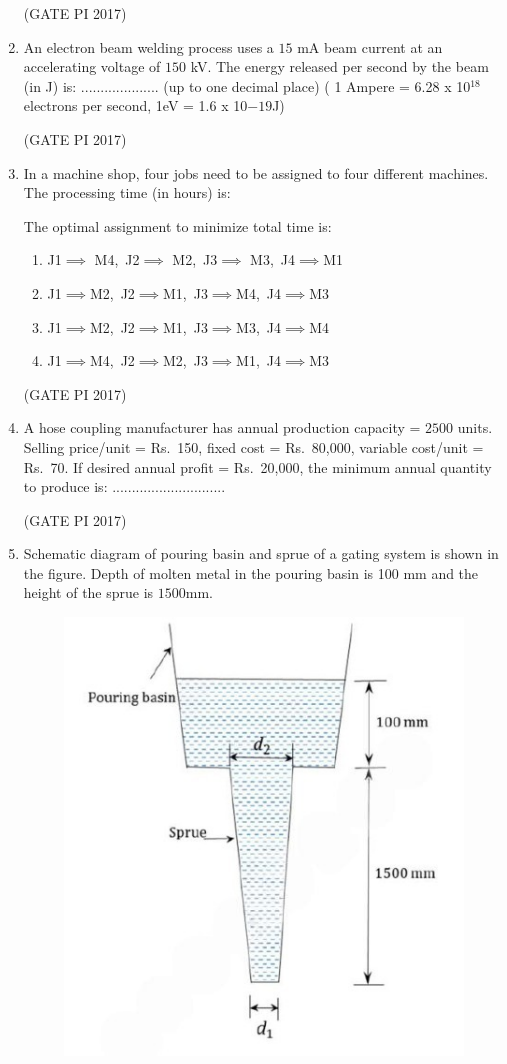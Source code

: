 \documentclass[journal,12pt,onecolumn]{IEEEtran}
\theoremstyle{remark}
\begin{document}
\begin{enumerate}
\hfill (GATE PI 2017)

\item An electron beam welding process uses a $15$ mA beam current at an accelerating voltage of $150$ kV.  
The energy released per second by the beam (in J) is:  
.................... (up to one decimal place) ( 1 Ampere = 6.28 x 10$^{18}$ electrons per second, 1eV = 1.6 x 10$-19$J)  

\hfill (GATE PI 2017)

\item In a machine shop, four jobs need to be assigned to four different machines. The processing time (in hours) is:



The optimal assignment to minimize total time is:
\begin{enumerate}
\item J1$\implies$ M4,\ J2$\implies$ M2,\ J3$\implies$ M3,\ J4$\implies$M1
\item J1$\implies$M2,\ J2$\implies$M1,\ J3$\implies$M4,\ J4$\implies$M3
\item J1$\implies$M2,\ J2$\implies$M1,\ J3$\implies$M3,\ J4$\implies$M4
\item J1$\implies$M4,\ J2$\implies$M2,\ J3$\implies$M1,\ J4$\implies$M3
\end{enumerate}
\hfill (GATE PI 2017)

\item A hose coupling manufacturer has annual production capacity = $2500$ units.  
Selling price/unit = Rs.\ 150, fixed cost = Rs.\ 80{,}000, variable cost/unit = Rs.\ 70.  
If desired annual profit = Rs.\ 20{,}000, the minimum annual quantity to produce is:  
............................. 

\hfill (GATE PI 2017)

\item Schematic diagram of pouring basin and sprue of a gating system is shown in the figure.  
Depth of molten metal in the pouring basin is 100 mm and the height of the sprue is $1500$mm.  



\begin{figure}[h]
    \centering
    \includegraphics[width=0.3\columnwidth]{fig9.png}
    \caption{}
    \label{fig:placeholder}
\end{figure}


\end{enumerate}
\end{document}
